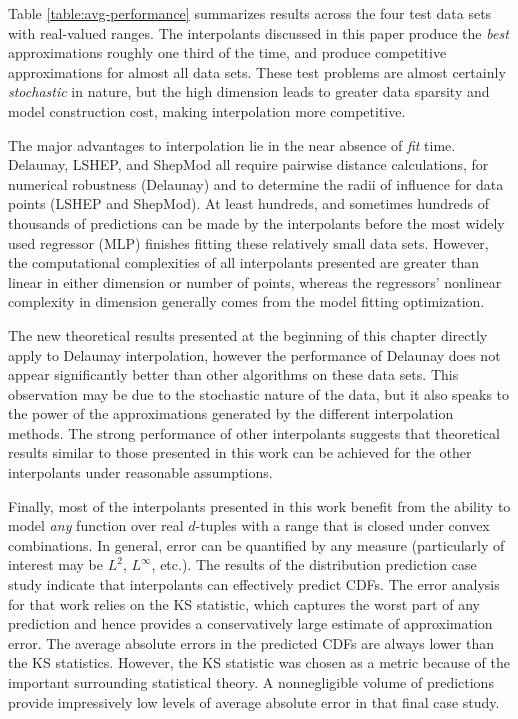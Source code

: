Table \ref{table:avg-performance} summarizes results across the four
test data sets with real-valued ranges. The interpolants discussed in
this paper produce the \textit{best} approximations roughly one third
of the time, and produce competitive approximations for almost all
data sets. These test problems are almost certainly
\textit{stochastic} in nature, but the high dimension leads to greater
data sparsity and model construction cost, making interpolation more
competitive.

The major advantages to interpolation lie in the near absence of
\textit{fit} time. Delaunay, LSHEP, and ShepMod all require pairwise
distance calculations, for numerical robustness (Delaunay) and to
determine the radii of influence for data points (LSHEP and
ShepMod). At least hundreds, and sometimes hundreds of thousands of
predictions can be made by the interpolants before the most widely
used regressor (MLP) finishes fitting these relatively small data
sets.  However, the computational complexities of all interpolants
presented are greater than linear in either dimension or number of
points, whereas the regressors' nonlinear complexity in dimension
generally comes from the model fitting optimization.

The new theoretical results presented at the beginning of this chapter
directly apply to Delaunay interpolation, however the performance of
Delaunay does not appear significantly better than other algorithms on
these data sets.  This observation may be due to the stochastic nature
of the data, but it also speaks to the power of the approximations
generated by the different interpolation methods.  The strong
performance of other interpolants suggests that theoretical results
similar to those presented in this work can be achieved for the other
interpolants under reasonable assumptions.

Finally, most of the interpolants presented in this work benefit from
the ability to model \textit{any} function over real $d$-tuples with a
range that is closed under convex combinations. In general, error can
be quantified by any measure (particularly of interest may be
$L^2$, $L^\infty$, etc.). The results of the distribution prediction
case study indicate that interpolants can effectively predict
CDFs. The error analysis for that work relies on the KS statistic,
which captures the worst part of any prediction and hence provides a
conservatively large estimate of approximation error. The average
absolute errors in the predicted CDFs are always lower than the KS
statistics. However, the KS statistic was chosen as a metric because
of the important surrounding statistical theory. A nonnegligible
volume of predictions provide impressively low levels of average
absolute error in that final case study.


